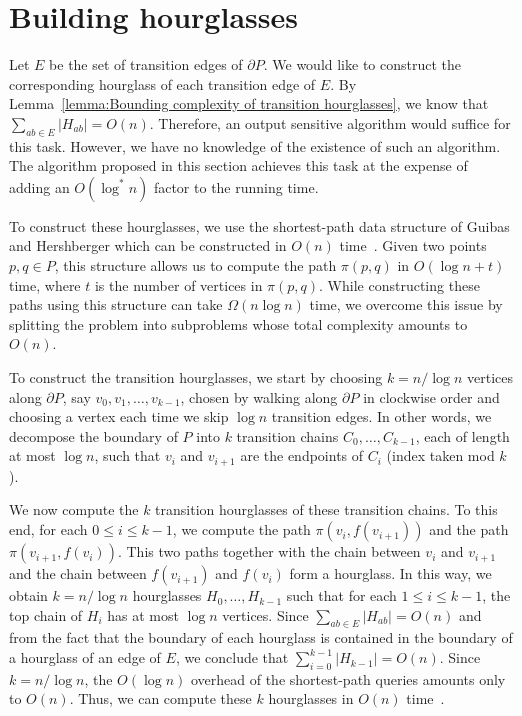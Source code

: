 \documentclass[a4paper,UKenglish]{lipics}
\newcommand{\ff}[1]{\ensuremath{f(#1)}}
\newcommand{\p}[2]{\ensuremath{\pi(#1, #2)}}
\begin{document}
\section{Building hourglasses}

Let $E$ be the set of transition edges of $\partial P$.
We would like to construct the corresponding hourglass of each transition edge of $E$.
By Lemma~\ref{lemma:Bounding complexity of transition hourglasses}, we know that $\sum_{ab\in E} |H_{ab}| = O(n)$.
Therefore, an output sensitive algorithm would suffice for this task. 
However, we have no knowledge of the existence of such an algorithm. 
The algorithm proposed in this section achieves this task at the expense of adding an $O(\log^*n)$ factor to the running time.

To construct these hourglasses, we use the shortest-path data structure of Guibas and Hershberger which can be constructed in $O(n)$ time~\cite{guibasShortestPathQueries}. 
Given two points $p,q\in P$, this structure allows us to compute the path $\p{p}{q}$ in $O(\log n + t)$ time, where $t$ is the number of vertices in $\p{p}{q}$. 
While constructing these paths using this structure can take $\Omega(n \log n)$ time, we overcome this issue by splitting the problem into subproblems whose total complexity amounts to $O(n)$.
 
To construct the transition hourglasses, we start by choosing $k = n/ \log n$ vertices along $\partial P$, say $v_0, v_1, \ldots, v_{k-1}$, chosen by walking along $\partial P$ in clockwise order and choosing a vertex each time we skip $\log n$ transition edges. 
In other words, we decompose the boundary of $P$ into $k$ transition chains $C_0, \ldots, C_{k-1}$, each of length at most $\log n$, such that $v_i$ and $v_{i+1}$ are the endpoints of $C_i$ (index taken mod $k$).

We now compute the $k$ transition hourglasses of these transition chains.
To this end, for each $0\leq i\leq k-1$, we compute the path $\p{v_i}{ \ff{v_{i+1}}}$ and the path $\p{v_{i+1}}{ \ff{v_i}}$. 
This two paths together with the chain between $v_i$ and $v_{i+1}$ and the chain between $\ff{v_{i+1}}$ and $\ff{v_i}$ form a hourglass. 
In this way, we obtain $k = n/\log n$ hourglasses $H_0, \ldots, H_{k-1}$ such that for each $1\leq i\leq k-1$, the top chain of $H_i$ has at most $\log n$ vertices.
Since $\sum_{ab\in E} |H_{ab}| = O(n)$ and from the fact that the boundary of each hourglass is contained in the boundary of a hourglass of an edge of $E$, we conclude that $\sum_{i=0} ^ {k-1} |H_{k-1}| = O(n)$.
Since $k = n/\log n$, the $O(\log n)$ overhead of the shortest-path queries amounts only to $O(n)$.
Thus, we can compute these $k$ hourglasses in $O(n)$ time~\cite{guibasShortestPathQueries}. 
\end{document}
